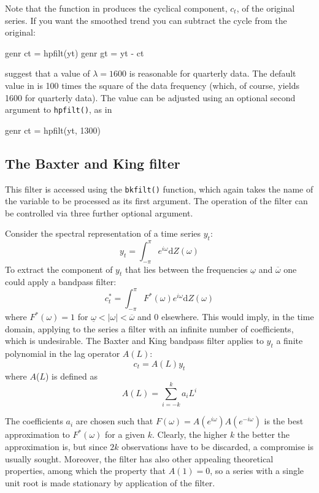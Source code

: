 Note that the  function in  produces the
cyclical component, $c_t$, of the original series.  If you want the
smoothed trend you can subtract the cycle from the original:

\begin{code}
genr ct = hpfilt(yt)
genr gt = yt - ct
\end{code}

\cite{hodrick97} suggest that a value of $\lambda = 1600$ is reasonable
for quarterly data.  The default value in  is 100 times the
square of the data frequency (which, of course, yields 1600 for
quarterly data).  The value can be adjusted using an optional
second argument to \verb+hpfilt()+, as in
%
\begin{code}
genr ct = hpfilt(yt, 1300)
\end{code}

\subsection{The Baxter and King filter}
\label{sec:baxter-king}

This filter is accessed using the \verb+bkfilt()+ function, which
again takes the name of the variable to be processed as its first
argument. The operation of the filter can be controlled via three
further optional argument.

Consider the spectral representation of a time series $y_t$:
%       
\[ y_t = \int_{-\pi}^{\pi} e^{i\omega} \mathrm{d} Z(\omega) \]
%
To extract the component of $y_t$ that lies between the frequencies
$\underline{\omega}$ and $\overline{\omega}$ one could apply a
bandpass filter:
%       
\[ c^*_t = \int_{-\pi}^{\pi} F^*(\omega) e^{i\omega} \mathrm{d}
Z(\omega) \]
%
where $F^*(\omega) = 1$ for $\underline{\omega} < |\omega| <
\overline{\omega}$ and 0 elsewhere. This would imply, in the time
domain, applying to the series a filter with an infinite number of
coefficients, which is undesirable. The Baxter and King bandpass
filter applies to $y_t$ a finite polynomial in the lag
operator $A(L)$:
%       
\[ c_t = A(L) y_t \]
%
where $A$($L$) is defined as
%       
\[ A(L) = \sum_{i=-k}^{k} a_i L^i \]

The coefficients $a_i$ are chosen such that $F(\omega)
= A(e^{i\omega})A(e^{-i\omega})$ is the best approximation to
$F^*(\omega)$ for a given $k$. Clearly, the higher $k$ the better the
approximation is, but since $2k$ observations have to be discarded, a
compromise is usually sought. Moreover, the filter has also other
appealing theoretical properties, among which the property that $A(1)
= 0$, so a series with a single unit root is made stationary by
application of the filter.

